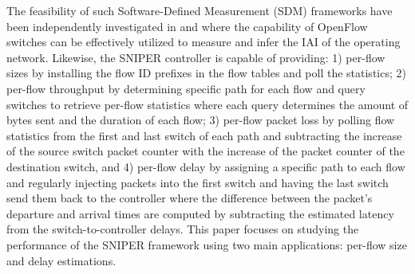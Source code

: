 The feasibility of such Software-Defined Measurement (SDM) frameworks
have been independently investigated in \cite{IF14iSTAMP:2014} and
\cite{Adrichen:2014} where the capability of OpenFlow switches can be
effectively utilized to measure and infer the IAI of the operating
network. Likewise, the SNIPER controller is capable of providing: 1)
per-flow sizes \cite{IF14iSTAMP:2014} by installing the flow ID
prefixes in the flow tables and poll the statistics; 2) per-flow
throughput \cite{Adrichen:2014} by determining specific path for each
flow and query switches to retrieve per-flow statistics where each
query determines the amount of bytes sent and the duration of each
flow; 3) per-flow packet loss \cite{Adrichen:2014} by polling flow
statistics from the first and last switch of each path and subtracting
the increase of the source switch packet counter with the increase of
the packet counter of the destination switch, and 4) per-flow delay
\cite{Adrichen:2014} by assigning a specific path to each flow and
regularly injecting packets into the first switch and having the last
switch send them back to the controller where the difference between
the packet's departure and arrival times are computed by subtracting
the estimated latency from the switch-to-controller delays. This paper
focuses on studying the performance of the SNIPER framework using two
main applications: per-flow size and delay estimations.

